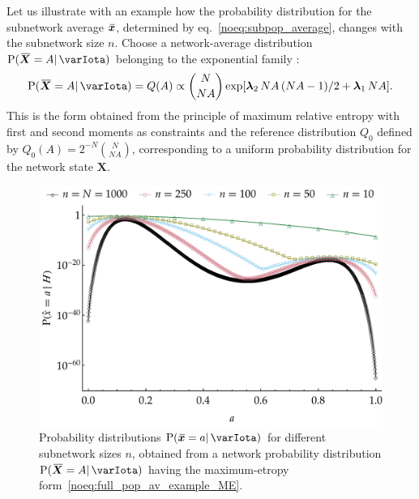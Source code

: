 \documentclass{article}
\theoremstyle{remark}
\theoremstyle{innote}
\newcommand*{\citep}{\parencites}
\renewcommand*{\|}{\mathpunct{|}}%
\newcommand*{\p}{\mathrm{P}}%
\newcommand*{\sect}{\S}%
\newcommand*{\eqn}{eq.}%
\newcommand*{\eg}{{e.g.}}
\theoremstyle{simple}
\newcommand*{\widebar}[1]{{\mkern1.5mu\skew{2}\overline{\mkern-1.5mu#1\mkern-1.5mu}\mkern 1.5mu}}
\newcommand*{\av}{\widebar} %
\newcommand*{\sav}{\widebar} %
\newcommand*{\yxx}{x}%
\newcommand*{\yx}{\bm{\yxx}}%
\newcommand*{\yxs}{\sav{\yx}}%
\newcommand*{\yX}{\bm{X}}%
\newcommand*{\yXf}{\av{\yX}}%
\newcommand*{\yH}{\varIota}
\newcommand*{\yl}{\bm{\lambda}}
\begin{document}
Let us illustrate with an example how the probability distribution for the
subnetwork average $\yxs$, determined by \eqn~\eqref{noeq:subpop_average},
changes with the subnetwork size $n$. Choose a network-average distribution
$\p(\yXf=A\| \yH)$ belonging to the exponential family
\cites[\sect~4.5.3]{bernardoetal1994}[see also][]{fortinietal2000}:
\begin{equation}
  \label{noeq:full_pop_av_example_ME}
  \p(\yXf = A \| \yH) = Q(A) \propto
\binom{N}{N A}\exp[
\yl_2\, N A\,(N A-1)/2 + \yl_1\, N A].
\end{equation}
This is the form obtained from the principle of maximum relative entropy
\citep[\eg:][]{jaynes1957,jaynes1963,good1963,jaynes1967,aczeletal1975,jaynes1979b,vancampenhoutetal1981,sivia1990,fangetal1997,bretthorst2013}
with first and second moments as constraints and the reference distribution
$Q_0$ defined by $Q_0(A) = 2^{-N}\binom{N}{N A}$, corresponding to a
uniform probability distribution for the network state $\yX$.
\begin{figure}[!b]
\centering
\includegraphics[width=0.95\columnwidth]{scaled_subpop_probs.pdf}%
\caption{Probability distributions $\p(\yxs = a \| \yH)$ for different
  subnetwork sizes $n$, obtained from a network probability
  distribution $\p(\yXf = A \| \yH)$ having the maximum-etropy
  form~\eqref{noeq:full_pop_av_example_ME}.}
\label{noscaling_distr}
\end{figure}
\end{document}
